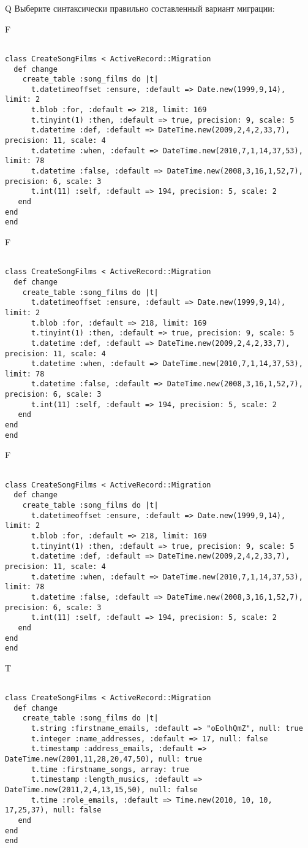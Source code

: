 Q
Выберите синтаксически правильно составленный вариант миграции:

F
\begin{verbatim}
		
class CreateSongFilms < ActiveRecord::Migration 
  def change 
    create_table :song_films do |t| 
      t.datetimeoffset :ensure, :default => Date.new(1999,9,14), limit: 2
      t.blob :for, :default => 218, limit: 169
      t.tinyint(1) :then, :default => true, precision: 9, scale: 5
      t.datetime :def, :default => DateTime.new(2009,2,4,2,33,7), precision: 11, scale: 4
      t.datetime :when, :default => DateTime.new(2010,7,1,14,37,53), limit: 78
      t.datetime :false, :default => DateTime.new(2008,3,16,1,52,7), precision: 6, scale: 3
      t.int(11) :self, :default => 194, precision: 5, scale: 2
   end
end
end
\end{verbatim}

F
\begin{verbatim}
		
class CreateSongFilms < ActiveRecord::Migration 
  def change 
    create_table :song_films do |t| 
      t.datetimeoffset :ensure, :default => Date.new(1999,9,14), limit: 2
      t.blob :for, :default => 218, limit: 169
      t.tinyint(1) :then, :default => true, precision: 9, scale: 5
      t.datetime :def, :default => DateTime.new(2009,2,4,2,33,7), precision: 11, scale: 4
      t.datetime :when, :default => DateTime.new(2010,7,1,14,37,53), limit: 78
      t.datetime :false, :default => DateTime.new(2008,3,16,1,52,7), precision: 6, scale: 3
      t.int(11) :self, :default => 194, precision: 5, scale: 2
   end
end
end
\end{verbatim}

F
\begin{verbatim}
		
class CreateSongFilms < ActiveRecord::Migration 
  def change 
    create_table :song_films do |t| 
      t.datetimeoffset :ensure, :default => Date.new(1999,9,14), limit: 2
      t.blob :for, :default => 218, limit: 169
      t.tinyint(1) :then, :default => true, precision: 9, scale: 5
      t.datetime :def, :default => DateTime.new(2009,2,4,2,33,7), precision: 11, scale: 4
      t.datetime :when, :default => DateTime.new(2010,7,1,14,37,53), limit: 78
      t.datetime :false, :default => DateTime.new(2008,3,16,1,52,7), precision: 6, scale: 3
      t.int(11) :self, :default => 194, precision: 5, scale: 2
   end
end
end
\end{verbatim}

T
\begin{verbatim}
		
class CreateSongFilms < ActiveRecord::Migration 
  def change 
    create_table :song_films do |t| 
      t.string :firstname_emails, :default => "oEolhQmZ", null: true
      t.integer :name_addresses, :default => 17, null: false
      t.timestamp :address_emails, :default => DateTime.new(2001,11,28,20,47,50), null: true
      t.time :firstname_songs, array: true
      t.timestamp :length_musics, :default => DateTime.new(2011,2,4,13,15,50), null: false
      t.time :role_emails, :default => Time.new(2010, 10, 10, 17,25,37), null: false
   end
end
end
\end{verbatim}

